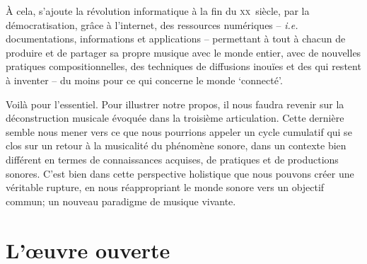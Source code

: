 \documentclass{article}
\begin{document}
À cela, s'ajoute la révolution informatique à la fin du \textsc{xx}\ieme ~siècle,  par la démocratisation, grâce à l'internet, des ressources numériques -- \textit{i.e.} documentations, informations et applications -- permettant à tout à chacun de produire et de partager sa propre musique avec le monde entier, avec de nouvelles pratiques compositionnelles, des techniques de diffusions inouïes et des qui restent à inventer -- du moins pour ce qui concerne le monde `connecté'.







\bigskip

Voilà pour l'essentiel. Pour illustrer notre propos, il nous faudra revenir sur la déconstruction musicale évoquée dans la troisième articulation. Cette dernière semble nous mener vers ce que nous pourrions appeler un cycle cumulatif qui se clos sur un retour à la musicalité du phénomène sonore, dans un contexte bien différent en termes de connaissances acquises, de pratiques et de productions sonores. %
C'est bien dans cette perspective holistique que nous pouvons créer une véritable rupture, en nous réappropriant le monde sonore vers un objectif commun; un nouveau paradigme de musique vivante.


%    
  

\section{L'œuvre ouverte}
\end{document}
